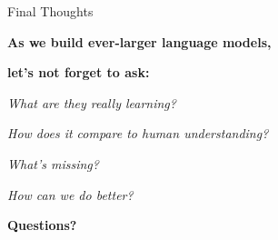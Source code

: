 \documentclass[aspectratio=169]{beamer}
\begin{document}
\begin{frame}{Final Thoughts 🌟}
\begin{center}
\LARGE
\textbf{As we build ever-larger language models,}

\vspace{0.5em}
\textbf{let's not forget to ask:}

\vspace{1em}
\textit{What are they really learning?}

\vspace{0.5em}
\textit{How does it compare to human understanding?}

\vspace{0.5em}
\textit{What's missing?}

\vspace{0.5em}
\textit{How can we do better?}

\vspace{1em}
\textbf{Questions? 🙋}
\end{center}
\end{frame}
\end{document}
